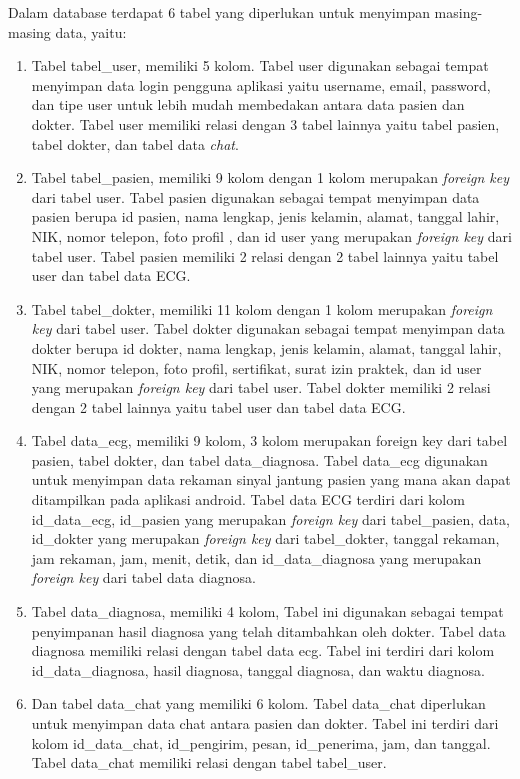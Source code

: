 Dalam database terdapat 6 tabel yang diperlukan untuk menyimpan masing-masing data, yaitu:
\begin{enumerate}[nolistsep]
	\item Tabel tabel\_user, memiliki 5 kolom. Tabel user digunakan sebagai tempat menyimpan data login pengguna aplikasi yaitu username, email, password, dan tipe user untuk lebih mudah membedakan antara data pasien dan dokter. Tabel user memiliki relasi dengan 3 tabel lainnya yaitu tabel pasien, tabel dokter, dan tabel data \textit{chat}.
	\item Tabel tabel\_pasien, memiliki 9 kolom dengan 1 kolom merupakan \textit{foreign key} dari tabel user. Tabel pasien digunakan sebagai tempat menyimpan data pasien berupa id pasien, nama lengkap, jenis kelamin, alamat, tanggal lahir, NIK, nomor telepon, foto profil , dan id user yang merupakan \textit{foreign key} dari tabel user. Tabel pasien memiliki 2 relasi dengan 2 tabel lainnya yaitu tabel user dan tabel data ECG.
	\item Tabel tabel\_dokter, memiliki 11 kolom  dengan 1 kolom merupakan \textit{foreign key} dari tabel user. Tabel dokter digunakan sebagai tempat menyimpan data dokter berupa id dokter, nama lengkap, jenis kelamin, alamat, tanggal lahir, NIK, nomor telepon, foto profil, sertifikat, surat izin praktek, dan id user yang merupakan \textit{foreign key} dari tabel user. Tabel dokter memiliki 2 relasi dengan 2 tabel lainnya yaitu tabel user dan tabel data ECG.  
	\item Tabel data\_ecg, memiliki 9 kolom, 3 kolom merupakan foreign key dari tabel pasien, tabel dokter, dan tabel data\_diagnosa. Tabel data\_ecg digunakan untuk menyimpan data rekaman sinyal jantung pasien yang mana akan dapat ditampilkan pada aplikasi android. Tabel data ECG terdiri dari kolom id\_data\_ecg, id\_pasien yang merupakan \textit{foreign key} dari tabel\_pasien, data, id\_dokter yang merupakan \textit{foreign key} dari tabel\_dokter, tanggal rekaman, jam rekaman, jam, menit, detik, dan id\_data\_diagnosa yang merupakan \textit{foreign key} dari tabel data diagnosa.
	\item Tabel data\_diagnosa, memiliki 4 kolom, Tabel ini digunakan sebagai tempat penyimpanan hasil diagnosa yang telah ditambahkan oleh dokter. Tabel data diagnosa memiliki relasi dengan tabel data ecg. Tabel ini terdiri dari kolom id\_data\_diagnosa, hasil diagnosa, tanggal diagnosa, dan waktu diagnosa.		
	\item Dan tabel data\_chat yang memiliki 6 kolom. Tabel data\_chat diperlukan untuk menyimpan data chat antara pasien dan dokter. Tabel ini terdiri dari kolom id\_data\_chat, id\_pengirim, pesan, id\_penerima, jam, dan tanggal. Tabel data\_chat memiliki relasi dengan tabel tabel\_user.
\end{enumerate}

